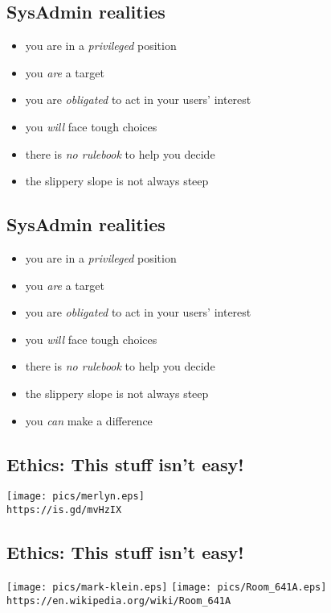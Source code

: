 \documentclass[xga]{xdvislides}
\begin{document}
\subsection{SysAdmin realities}
\begin{itemize}
	\item you are in a {\em privileged} position
	\item you {\em are} a target
	\item you are {\em obligated} to act in your users' interest
	\item you {\em will} face tough choices
	\item there is {\em no rulebook} to help you decide
	\item the slippery slope is not always steep
\end{itemize}

\subsection{SysAdmin realities}
\begin{itemize}
	\item you are in a {\em privileged} position
	\item you {\em are} a target
	\item you are {\em obligated} to act in your users' interest
	\item you {\em will} face tough choices
	\item there is {\em no rulebook} to help you decide
	\item the slippery slope is not always steep
	\item you {\em can} make a difference
\end{itemize}

\subsection{Ethics: This stuff isn't easy!}
\vspace{.5in}
\begin{center}
       \texttt{[image: pics/merlyn.eps]} \\

	\small
	{\tt https://is.gd/mvHzIX}\hspace{.5in}{\tt https://is.gd/djUzAO}
	\Normalsize
\end{center}


\subsection{Ethics: This stuff isn't easy!}
\vspace{.5in}
\begin{center}
       \texttt{[image: pics/mark-klein.eps]}
       \texttt{[image: pics/Room\_641A.eps]} \\

	\small
	{\tt https://en.wikipedia.org/wiki/Room\_641A}
	\Normalsize
\end{center}
\end{document}

